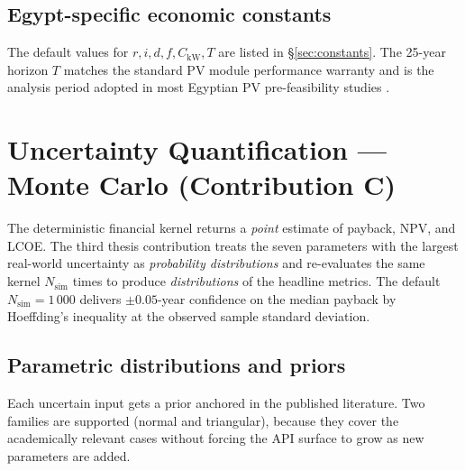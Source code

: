 \subsection{Egypt-specific economic constants}

The default values for $r, i, d, f, C_{\text{kW}}, T$ are listed in
\S\ref{sec:constants}. The 25-year horizon $T$ matches the standard
PV module performance warranty and is the analysis period adopted in
most Egyptian PV pre-feasibility studies \citep{mahmoud2023}.

\section{Uncertainty Quantification --- Monte Carlo (Contribution C)}
\label{sec:montecarlo}

The deterministic financial kernel returns a \emph{point} estimate of
payback, NPV, and LCOE. The third thesis contribution treats the
seven parameters with the largest real-world uncertainty as
\emph{probability distributions} and re-evaluates the same kernel
$N_{\text{sim}}$ times to produce \emph{distributions} of the
headline metrics. The default $N_{\text{sim}} = 1\,000$ delivers
$\pm 0.05$-year confidence on the median payback by Hoeffding's
inequality at the observed sample standard deviation.

\subsection{Parametric distributions and priors}

Each uncertain input gets a prior anchored in the published
literature. Two families are supported (normal and triangular),
because they cover the academically relevant cases without forcing
the API surface to grow as new parameters are added.

